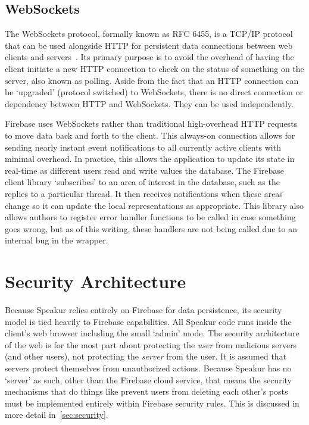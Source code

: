 \subsection{WebSockets}
\label{sec:websockets}
The WebSockets protocol, formally known as RFC 6455, 
is a TCP/IP protocol that can be used alongside HTTP for persistent data connections between web clients and servers~\cite{mozillacontributors2015-a}.
Its primary purpose is to avoid the overhead of having the client initiate a new HTTP connection to check on the status of something on the server, also known as polling.
Aside from the fact that an HTTP connection can be `upgraded' (protocol switched) to WebSockets,
there is no direct connection or dependency between HTTP and WebSockets.
They can be used independently.

Firebase uses WebSockets rather than traditional high-overhead HTTP requests to move data back and forth to the client.
This always-on connection allows for sending nearly instant event notifications to all currently active clients with minimal overhead.
In practice, this allows the application to update its state in real-time as different users read and write values the database.
The Firebase client library `subscribes' to an area of interest in the database, such as the replies to a particular thread.
It then receives notifications when these areas change so it can update the local representations as appropriate.
This library also allows authors to register error handler functions to be called in case something goes wrong, but as of this writing, these handlers are not being called due to an internal bug in the  wrapper.

\section{Security Architecture}
\label{sec:arch_security}
Because Speakur relies entirely on Firebase for data persistence, its security model is tied heavily to Firebase capabilities. 
All Speakur code runs inside the client's web browser including the small `admin' mode.
The security architecture of the web is for the most part about protecting the \textit{user} from malicious servers (and other users), not protecting the \textit{server} from the user.
It is assumed that servers protect themselves from unauthorized actions.
Because Speakur has no `server' as such, 
other than the Firebase cloud service,
that means the security mechanisms that do things like prevent users from deleting each other's posts 
must be implemented entirely within Firebase security rules.
This is discussed in more detail in~\cref{sec:security}.

